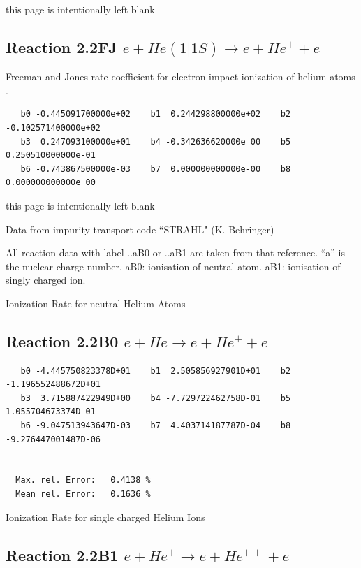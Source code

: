 \documentclass[12pt,dvips]{article}
\begin{document}
\newpage
this page is intentionally left blank
\newpage


\subsection{
Reaction 2.2FJ  $e + He(1|1S) \rightarrow e + He^+ + e$ } Freeman
and Jones rate coefficient for electron impact ionization of helium atoms \cite{kn:Freeman} .

\begin{small}\begin{verbatim}
   b0 -0.445091700000e+02    b1  0.244298800000e+02    b2 -0.102571400000e+02
   b3  0.247093100000e+01    b4 -0.342636620000e 00    b5  0.250510000000e-01
   b6 -0.743867500000e-03    b7  0.000000000000e-00    b8  0.000000000000e 00
\end{verbatim}\end{small}
\newpage
this page is intentionally left blank
\newpage

Data from impurity transport code ``STRAHL" (K. Behringer) \cite{kn:Behringer}

All reaction data with label ..aB0 or ..aB1 are taken from that
reference. ``a'' is the nuclear charge number. aB0: ionisation of neutral atom. aB1: ionisation of singly charged ion.

Ionization Rate for neutral Helium Atoms



\subsection{
Reaction 2.2B0   $e + He \rightarrow e + He^+ + e $
}
\begin{small}\begin{verbatim}
   b0 -4.445750823378D+01    b1  2.505856927901D+01    b2 -1.196552488672D+01
   b3  3.715887422949D+00    b4 -7.729722462758D-01    b5  1.055704673374D-01
   b6 -9.047513943647D-03    b7  4.403714187787D-04    b8 -9.276447001487D-06


  Max. rel. Error:   0.4138 %
  Mean rel. Error:   0.1636 %
\end{verbatim}\end{small}

  Ionization Rate for single charged Helium Ions

\subsection{
Reaction 2.2B1   $e + He^+ \rightarrow e + He^{++} + e$
}
\end{document}
